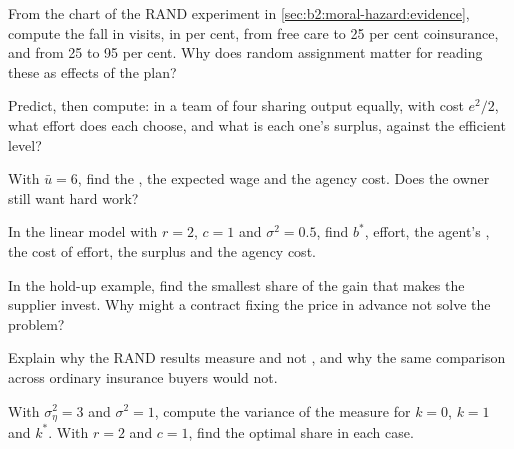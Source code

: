 \begin{exercise}[$\star$]\label{exo:b2:moral-hazard:3}
From the chart of the RAND experiment in \cref{sec:b2:moral-hazard:evidence}, compute the fall in visits, in per cent, from free care to 25 per cent coinsurance, and from 25
to 95 per cent. Why does random assignment matter for reading these as effects of the plan?
\end{exercise}

\begin{exercise}[$\star$]\label{exo:b2:moral-hazard:4}
Predict, then compute: in a team of four sharing output equally, with cost $e^2/2$, what effort does each choose, and what is
each one's surplus, against the efficient level?
\end{exercise}

\begin{exercise}[$\star\star$]\label{exo:b2:moral-hazard:5}
With $\bar u = 6$, find the , the expected wage and the agency cost. Does the owner still want hard work?
\end{exercise}

\begin{exercise}[$\star\star$]\label{exo:b2:moral-hazard:6}
In the linear model with $r = 2$, $c = 1$ and $\sigma^2 = 0.5$, find $b^*$, effort, the agent's , the cost of effort, the surplus and
the agency cost.
\end{exercise}

\begin{exercise}[$\star\star$]\label{exo:b2:moral-hazard:7}
In the hold-up example, find the smallest share of the gain that makes the supplier invest. Why might a contract fixing
the price in advance not solve the problem?
\end{exercise}

\begin{exercise}[$\star\star$]\label{exo:b2:moral-hazard:8}
Explain why the RAND results measure  and not , and why the same comparison across ordinary
insurance buyers would not.
\end{exercise}

\begin{exercise}[$\star\star$]\label{exo:b2:moral-hazard:9}
With $\sigma_\eta^2 = 3$ and $\sigma^2 = 1$, compute the variance of the measure for $k = 0$, $k = 1$ and $k^*$. With $r = 2$ and $c = 1$, find the optimal share in
each case.
\end{exercise}

